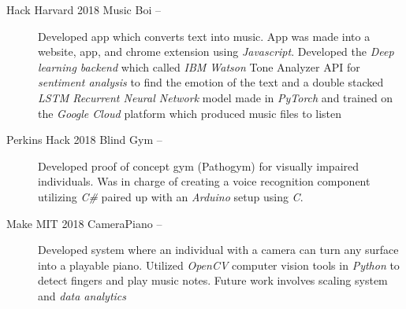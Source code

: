 \documentclass[letterpaper, 8pt]{extarticle}
\begin{document}
\begin{description}
\item[Hack Harvard 2018 Music Boi --] Developed app which converts text into music. App was made into a website, app, and chrome extension using \emph{Javascript}. Developed the \emph{Deep learning backend} which called \emph{IBM Watson} Tone Analyzer API for \emph{sentiment analysis} to find the emotion of the text and a double stacked \emph{LSTM Recurrent Neural Network} model made in \emph{PyTorch} and trained on the \emph{Google Cloud} platform which produced music files to listen

\item[Perkins Hack 2018 Blind Gym --]  Developed proof of concept gym (Pathogym) for visually impaired individuals. Was in charge of creating a voice recognition component utilizing \emph{C\#} paired up with an \emph{Arduino} setup using \emph{C}.

\item[Make MIT 2018 CameraPiano --] Developed system where an individual with a camera can turn any surface into a playable piano. Utilized \emph{OpenCV} computer vision tools in \emph{Python} to detect fingers and play music notes. Future work involves scaling system and \emph{data analytics}

\end{description}
\end{document}
